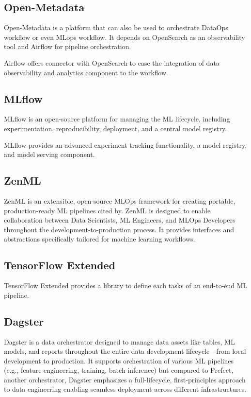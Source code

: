 \subsection{Open-Metadata}\label{subsec:openmetadata}
Open-Metadata is a platform that can also be used to orchestrate DataOps workflow or even MLops workflow.
It depends on OpenSearch as an observability tool and Airflow for pipeline orchestration.

Airflow offers connector with OpenSearch to ease the integration of data observability and analytics component to the workflow.

\subsection{MLflow}\label{subsec:mlflow}
MLflow is an open-source platform for managing the ML lifecycle, including experimentation, reproducibility,
deployment, and a central model registry.\cite{mlflow}

MLflow provides an advanced experiment tracking functionality, a model registry, and
model serving component\cite{Kreuzberger2022MachineLO}.

\subsection{ZenML}\label{subsec:zenml}
ZenML is an extensible, open-source MLOps framework for creating portable, production-ready ML pipelines cited by\cite{blockchain-mlops}.
ZenML is designed to enable collaboration between Data Scientists, ML Engineers, and MLOps Developers throughout the development-to-production process\cite{landscape}.
It provides interfaces and abstractions specifically tailored for machine learning workflows.

\subsection{TensorFlow Extended}\label{subsec:tensorflow-extended}
TensorFlow Extended provides a library to define each tasks of an end-to-end ML
pipeline\cite{Kreuzberger2022MachineLO}.

\subsection{Dagster}\label{subsec:dagster}
Dagster is a data orchestrator designed to manage data assets like tables, ML models, and reports throughout the entire data development lifecycle—from local development to production\cite{landscape}.
It supports orchestration of various ML pipelines (e.g., feature engineering, training, batch inference) but
compared to Prefect, another orchestrator, Dagster emphasizes a full-lifecycle, first-principles approach to data engineering enabling seamless deployment across different infrastructures\cite{landscape}.
